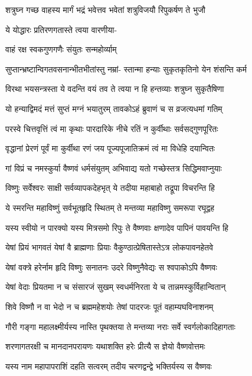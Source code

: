 \twolineshloka
{शत्रुघ्न गच्छ वाहस्य मार्गं भद्रं भवेत्तव}
{भवेतां शत्रुविजयौ रिपुकर्षण ते भुजौ}%

ये योद्धारः प्रतिरणगतास्ते त्वया वारणीया-

वाहं रक्ष स्वकगुणगणैः संयुतः सन्महोर्व्याम्

\twolineshloka
{सुप्तान्भ्रष्टान्विगतवसनान्भीतभीतांस्तु नम्रां-}
{स्तान्मा हन्याः सुकृतकृतिनो येन शंसन्ति कर्म}%

\twolineshloka
{विरथा भयसन्त्रस्ता ये वदन्ति वयं तव}
{ते त्वया न हि हन्तव्याः शत्रुघ्न सुकृतैषिणा}%

\twolineshloka
{यो हन्याद्विमदं मत्तं सुप्तं मग्नं भयातुरम्}
{तावकोऽहं ब्रुवाणं च स व्रजत्यधमां गतिम्}%

\twolineshloka
{परस्वे चित्तवृत्तिं त्वं मा कृथाः पारदारिके}
{नीचे रतिं न कुर्वीथाः सर्वसद्गुणपूरितः}%

\twolineshloka
{वृद्धानां प्रेरणं पूर्वं मा कुर्वीथा रणं जय}
{पूज्यपूजातिक्रमं त्वं मा विधेहि दयान्वितः}%

\twolineshloka
{गां विप्रं च नमस्कुर्या वैष्णवं धर्मसंयुतम्}
{अभिवाद्य यतो गच्छेस्तत्र सिद्धिमवाप्नुयाः}%

\twolineshloka
{विष्णुः सर्वेश्वरः साक्षी सर्वव्यापकदेहभृत्}
{ये तदीया महाबाहो तद्रूपा विचरन्ति हि}%

\twolineshloka
{ये स्मरन्ति महाविष्णुं सर्वभूतहृदि स्थितम्}
{ते मन्तव्या महाविष्णु समरूपा रघूद्वह}%

\twolineshloka
{यस्य स्वीयो न पारक्यो यस्य मित्रसमो रिपुः}
{ते वैष्णवाः क्षणादेव पापिनं पावयन्ति हि}%

\twolineshloka
{येषां प्रियं भागवतं येषां वै ब्राह्मणाः प्रियाः}
{वैकुण्ठात्प्रेषितास्तेऽत्र लोकपावनहेतवे}%

\twolineshloka
{येषां वक्त्रे हरेर्नाम हृदि विष्णुः सनातनः}
{उदरे विष्णुनैवेद्यः स श्वपाकोऽपि वैष्णवः}%

\twolineshloka
{येषां वेदाः प्रियतमा न च संसारजं सुखम्}
{स्वधर्मनिरता ये च तान्नमस्कुर्विहान्वितान्}%

\twolineshloka
{शिवे विष्णौ न वा भेदो न च ब्रह्ममहेशयोः}
{तेषां पादरजः पूतं वहाम्यघविनाशनम्}%

\twolineshloka
{गौरी गङ्गा महालक्ष्मीर्यस्य नास्ति पृथक्तया}
{ते मन्तव्या नराः सर्वे स्वर्गलोकादिहागताः}%

\twolineshloka
{शरणागतरक्षी च मानदानपरायणः}
{यथाशक्ति हरेः प्रीत्यै स ज्ञेयो वैष्णवोत्तमः}%

\twolineshloka
{यस्य नाम महापापराशिं दहति सत्वरम्}
{तदीय चरणद्वन्द्वे भक्तिर्यस्य स वैष्णवः}%

